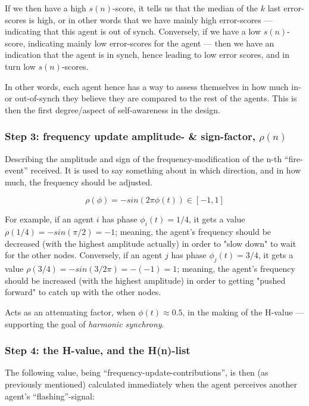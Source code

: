	If we then have a high $s(n)$-score, it tells us that the median of the $k$ last error-scores is high, or in other words that we have mainly high error-scores — indicating that this agent is out of synch. Conversely, if we have a low $s(n)$-score, indicating mainly low error-scores for the agent — then we have an indication that the agent is in synch, hence leading to low error scores, and in turn low $s(n)$-scores. 
	
	In other words, each agent hence has a way to assess themselves in how much in- or out-of-synch they believe they are compared to the rest of the agents. This is then the first degree/aspect of  self-awareness in the design.
	
	\subsubsection{Step 3: frequency update amplitude- \& sign-factor, $\rho(n)$}
	
	Describing the amplitude and sign of the frequency-modification of the n-th ``fire-event'' received. It is used to say something about in which direction, and in how much, the frequency should be adjusted.
	
	\begin{equation}
	\label{amp_sign_freq_adj}
		\rho(\phi) = - sin(2\pi\phi(t)) \in [-1, 1]
	\end{equation}
	
	For example, if an agent $i$ has phase $\phi_i(t)=1/4$, it gets a value $\rho(1/4) = - sin(\pi/2) = -1$; meaning, the agent's frequency should be decreased (with the highest amplitude actually) in order to "slow down" to wait for the other nodes. Conversely, if an agent $j$ has phase $\phi_j(t)=3/4$, it gets a value $\rho(3/4) = - sin(3/2 \pi) = -(-1) = 1$; meaning, the agent's frequency should be increased (with the highest amplitude) in order to getting "pushed forward" to catch up with the other nodes.
	
	Acts as an attenuating factor, when $\phi(t)\approx0.5$, in the making of the H-value — supporting the goal of \textit{harmonic synchrony}.

	\subsubsection{Step 4: the H-value, and the H(n)-list}
	
	The following value, being ``frequency-update-contributions'', is then (as previously mentioned) calculated immediately when the agent perceives another agent's ``flashing''-signal:
	

